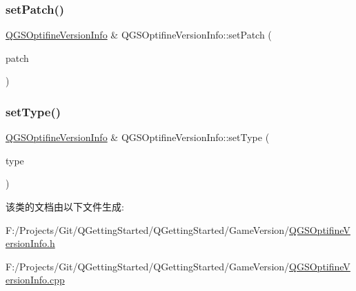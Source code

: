 \mbox{\label{class_q_g_s_optifine_version_info_a07b41fc1bc8ec50f0f5c76f265fa41d3}} 
\subsubsection{\texorpdfstring{set\+Patch()}{setPatch()}}
{\footnotesize\ttfamily \mbox{\hyperlink{class_q_g_s_optifine_version_info}{Q\+G\+S\+Optifine\+Version\+Info}} \& Q\+G\+S\+Optifine\+Version\+Info\+::set\+Patch (\begin{DoxyParamCaption}\item[{const Q\+String \&}]{patch }\end{DoxyParamCaption})}

\mbox{\label{class_q_g_s_optifine_version_info_a0ec800a565f7a2c9d6327aec0a80be66}} 
\subsubsection{\texorpdfstring{set\+Type()}{setType()}}
{\footnotesize\ttfamily \mbox{\hyperlink{class_q_g_s_optifine_version_info}{Q\+G\+S\+Optifine\+Version\+Info}} \& Q\+G\+S\+Optifine\+Version\+Info\+::set\+Type (\begin{DoxyParamCaption}\item[{const Q\+String \&}]{type }\end{DoxyParamCaption})}



该类的文档由以下文件生成\+:\begin{DoxyCompactItemize}
\item 
F\+:/\+Projects/\+Git/\+Q\+Getting\+Started/\+Q\+Getting\+Started/\+Game\+Version/\mbox{\hyperlink{_q_g_s_optifine_version_info_8h}{Q\+G\+S\+Optifine\+Version\+Info.\+h}}\item 
F\+:/\+Projects/\+Git/\+Q\+Getting\+Started/\+Q\+Getting\+Started/\+Game\+Version/\mbox{\hyperlink{_q_g_s_optifine_version_info_8cpp}{Q\+G\+S\+Optifine\+Version\+Info.\+cpp}}\end{DoxyCompactItemize}
